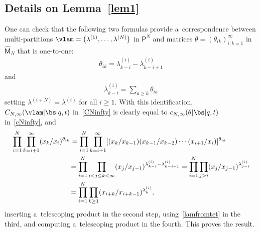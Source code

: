 \subsection[Details on Lemma~3.5]{Details on Lemma~\ref{lem1}}\label{app:prooflem1}
One can check that the following two formulas provide a~correspondence between multi-partitions $\vlam=\big(\lambda^{(1)},\dots,\lambda^{(N)}\big)$ in $\mathsf{P}^N$ and matrices $\theta=(\theta_{ik})_{i,k=1}^\infty$ in $\hat{\mathsf{M}}_N$ that is one-to-one:
\begin{gather*}
\theta_{ik} = \lambda^{(i)}_{k-i}-\lambda^{(i)}_{k-i+1}
\end{gather*}
and
\begin{gather}\label{lamfromtet}
\lambda^{(i)}_{k-i} = \sum_{a\geq k}\theta_{ia}
\end{gather}
setting $\lambda^{(i+N)}=\lambda^{(i)}$ for all $i\geq 1$. With this identification, $C_{N,\infty}(\vlam|\bs|q,t)$ in~\eqref{CNinfty} is clearly equal to $c_{N,\infty}(\theta|\bs|q,t)$ in~\eqref{cNinfty}, and
\begin{gather*}
\begin{split}
&\prod_{i=1}^N \prod_{k=i+1}^\infty (x_k/x_i)^{\theta_{ik}} = \prod_{i=1}^N \prod_{k=i+1}^\infty [(x_k/x_{k-1})(x_{k-1}/x_{k-2})\cdots (x_{i+1}/x_i)]^{\theta_{ik}}
\\ &\hphantom{\prod_{i=1}^N \prod_{k=i+1}^\infty (x_k/x_i)^{\theta_{ik}}}
{}= \prod_{i=1}^N \prod_{i<j\leq k<\infty} (x_j/x_{j-1})^{ \lambda^{(i)}_{k-i}-\lambda^{(i)}_{k-i+1}}
 = \prod_{i=1}^N \prod_{j>i} (x_j/x_{j-1})^{\lambda^{(i)}_{j-i}}
\\ &\hphantom{\prod_{i=1}^N \prod_{k=i+1}^\infty (x_k/x_i)^{\theta_{ik}}}
{}= \prod_{i=1}^N \prod_{k\geq 1}(x_{i+k}/x_{i+k-1})^{\lambda^{(i)}_k},
\end{split}
\end{gather*}
inserting a~telescoping product in the second step, using~\eqref{lamfromtet} in the third, and computing a~telescoping product in the fourth. This proves the result.

